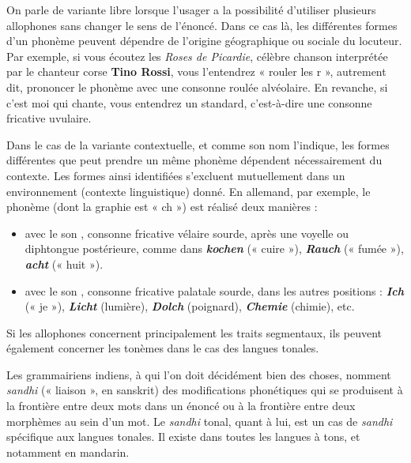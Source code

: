 On parle de variante libre lorsque l’usager a la possibilité d’utiliser plusieurs allophones sans changer le sens de l’énoncé. Dans ce cas là, les différentes formes d’un phonème peuvent dépendre de l’origine géographique ou sociale du locuteur. Par exemple, si vous écoutez les \textit{Roses de Picardie}, célèbre chanson interprétée par le chanteur corse \textbf{Tino Rossi}, vous l’entendrez « rouler les r », autrement dit, prononcer le phonème  avec une consonne roulée alvéolaire. En revanche, si c’est moi qui chante, vous entendrez un \bipa{[ʁ]} standard, c’est-à-dire une consonne fricative uvulaire.

Dans le cas de la variante contextuelle, et comme son nom l’indique, les formes différentes que peut prendre un même phonème dépendent nécessairement du contexte. Les formes ainsi identifiées s’excluent mutuellement dans un environnement (contexte linguistique) donné. En allemand, par exemple, le phonème  (dont la graphie est « ch ») est réalisé deux manières :
\begin{itemize}
\item avec le son \bipa{[x]}, consonne fricative vélaire sourde, après une voyelle ou diphtongue postérieure, comme dans \textbf{\textit{kochen}} (« cuire »), \textbf{\textit{Rauch}} (« fumée »), \textbf{\textit{acht}} (« huit »).
\item avec le son \bipa{[ç]}, consonne fricative palatale sourde, dans les autres positions : \textbf{\textit{Ich}} (« je »), \textbf{\textit{Licht}} (lumière), \textbf{\textit{Dolch}} (poignard), \textbf{\textit{Chemie}} (chimie), etc.
\end{itemize}

Si les allophones concernent principalement les traits segmentaux, ils peuvent également concerner les tonèmes dans le cas des langues tonales.

Les grammairiens indiens, à qui l’on doit décidément bien des choses, nomment \textit{sandhi} (« liaison », en sanskrit) des modifications phonétiques qui se produisent à la frontière entre deux mots dans un énoncé ou à la frontière entre deux morphèmes au sein d’un mot. Le \textit{sandhi} tonal, quant à lui, est un cas de \textit{sandhi} spécifique aux langues tonales. Il existe dans toutes les langues à tons, et notamment en mandarin.

